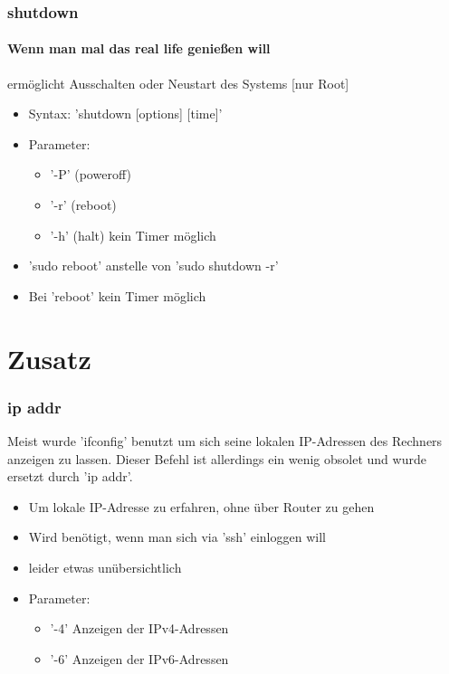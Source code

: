 \documentclass[12pt,utf8, handout]{beamer}
\begin{document}
\begin{frame}
\frametitle{shutdown}
\framesubtitle{\textcolor{ownDarkOr}{Wenn man mal das real life genießen will}}
ermöglicht Ausschalten oder Neustart des Systems [nur Root]
\begin{itemize}[<+->]
	\item Syntax: 'shutdown [options] [time]'
	\item Parameter:
	\begin{itemize}[<+->]
		\item '-P' (poweroff)
		\item '-r' (reboot) 
		\item '-h' (halt) kein Timer möglich
	\end{itemize}
	\item 'sudo reboot' anstelle von 'sudo shutdown -r'
	\item Bei 'reboot' kein Timer möglich
\end{itemize}
\end{frame}

\section{Zusatz}
\begin{frame}
\frametitle{ip addr}
Meist wurde 'ifconfig' benutzt um sich seine lokalen IP-Adressen des Rechners anzeigen zu lassen. Dieser Befehl ist allerdings ein wenig obsolet und wurde ersetzt durch 'ip addr'.
\begin{itemize}
	\item Um lokale IP-Adresse zu erfahren, ohne über Router zu gehen
	\item Wird benötigt, wenn man sich via 'ssh' einloggen will
	\item leider etwas unübersichtlich
	\item Parameter:
	\begin{itemize}
		\item '-4' Anzeigen der IPv4-Adressen
		\item '-6' Anzeigen der IPv6-Adressen
	\end{itemize}
\end{itemize}
\end{frame}
\end{document}

